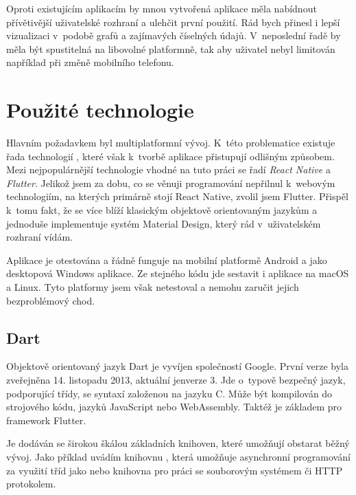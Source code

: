 \documentclass[
  biblatex,
  figures=true,
  tables=false,
  glossaries,
  index
]{kidiplom}
\begin{document}
Oproti existujícím aplikacím by mnou vytvořená aplikace měla nabídnout přívětivější uživatelské rozhraní a ulehčit první použití. Rád bych přinesl i lepší vizualizaci v~podobě grafů a zajímavých číselných údajů. V~neposlední řadě by měla být spustitelná na libovolné platformně, tak aby uživatel nebyl limitován například při změně mobilního telefonu.

\section{Použité technologie}

Hlavním požadavkem byl multiplatformní vývoj. K~této problematice existuje řada technologií \cite{jetbrains-crossplatform}, které však k~tvorbě aplikace přistupují odlišným způsobem. Mezi nejpopulárnější technologie vhodné na tuto práci se řadí \textit{React Native} a \textit{Flutter}. Jelikož jsem za dobu, co se věnuji programování nepřilnul k~webovým technologiím, na kterých primárně stojí React Native, zvolil jsem Flutter. Přispěl k~tomu fakt, že se více blíží klasickým objektově orientovaným jazykům a jednoduše implementuje systém Material Design, který rád v~uživatelském rozhraní vídám.

Aplikace je otestována a řádně funguje na mobilní platformě Android a jako desktopová Windows aplikace. Ze stejného kódu jde sestavit i aplikace na macOS a Linux. Tyto platformy jsem však netestoval a nemohu zaručit jejich bezproblémový chod.

\subsection{Dart}
Objektově orientovaný jazyk Dart \cite{dart} je vyvíjen společností Google. První verze byla zveřejněna 14. listopadu 2013, aktuální jenverze 3. Jde o~typově bezpečný jazyk, podporující třídy, se syntaxí založenou na jazyku C. Může být kompilován do strojového kódu, jazyků JavaScript nebo WebAssembly. Taktéž je základem pro framework Flutter.

\kiinlinecode{}{;}
Je dodáván se širokou škálou základních knihoven, které umožňují obstarat běžný vývoj. Jako příklad uvádím knihovnu , která umožňuje asynchronní programování za využití tříd jako  nebo knihovna  pro práci se souborovým systémem či HTTP protokolem.
\end{document}
